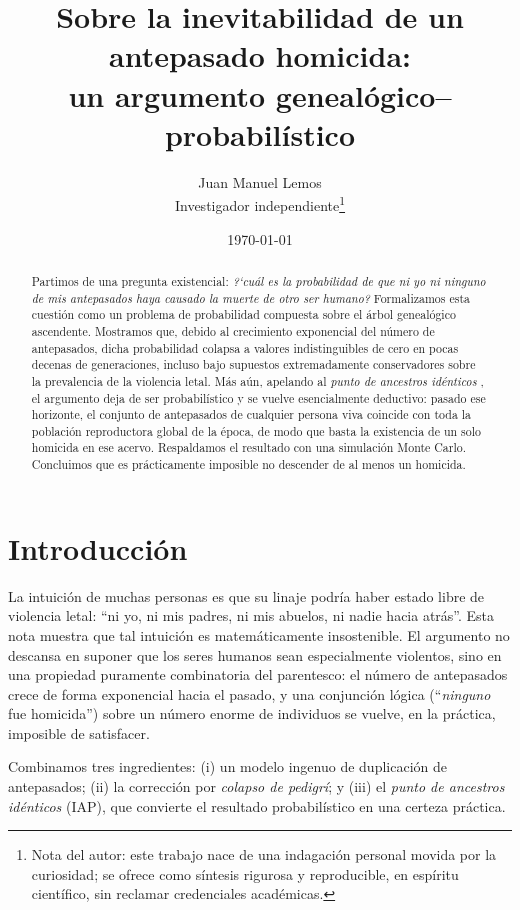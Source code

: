 \documentclass[11pt]{article}
\title{\textbf{Sobre la inevitabilidad de un antepasado homicida:\\
un argumento geneal\'ogico--probabil\'istico}}
\author{Juan Manuel Lemos\\
\normalsize Investigador independiente\thanks{Nota del autor: este trabajo nace
de una indagaci\'on personal movida por la curiosidad; se ofrece como s\'intesis
rigurosa y reproducible, en esp\'iritu cient\'ifico, sin reclamar credenciales
acad\'emicas.}}
\date{\today}
\begin{document}
\maketitle

\begin{abstract}
\noindent Partimos de una pregunta existencial: \emph{?`cu\'al es la
probabilidad de que ni yo ni ninguno de mis antepasados haya causado la muerte
de otro ser humano?} Formalizamos esta cuesti\'on como un problema de
probabilidad compuesta sobre el \'arbol geneal\'ogico ascendente. Mostramos que,
debido al crecimiento exponencial del n\'umero de antepasados, dicha
probabilidad colapsa a valores indistinguibles de cero en pocas decenas de
generaciones, incluso bajo supuestos extremadamente conservadores sobre la
prevalencia de la violencia letal. M\'as a\'un, apelando al \emph{punto de
ancestros id\'enticos} \citep{rohde2004}, el argumento deja de ser
probabil\'istico y se vuelve esencialmente deductivo: pasado ese horizonte, el
conjunto de antepasados de cualquier persona viva coincide con toda la
poblaci\'on reproductora global de la \'epoca, de modo que basta la existencia
de un solo homicida en ese acervo. Respaldamos el resultado con una simulaci\'on
Monte Carlo. Concluimos que es pr\'acticamente imposible no descender de al
menos un homicida.
\end{abstract}

\section{Introducci\'on}

La intuici\'on de muchas personas es que su linaje podr\'ia haber estado libre
de violencia letal: ``ni yo, ni mis padres, ni mis abuelos, ni nadie hacia
atr\'as''. Esta nota muestra que tal intuici\'on es matem\'aticamente
insostenible. El argumento no descansa en suponer que los seres humanos sean
especialmente violentos, sino en una propiedad puramente combinatoria del
parentesco: el n\'umero de antepasados crece de forma exponencial hacia el
pasado, y una conjunci\'on l\'ogica (``\emph{ninguno} fue homicida'') sobre un
n\'umero enorme de individuos se vuelve, en la pr\'actica, imposible de
satisfacer.

Combinamos tres ingredientes: (i) un modelo ingenuo de duplicaci\'on de
antepasados; (ii) la correcci\'on por \emph{colapso de pedigr\'i}; y (iii) el
\emph{punto de ancestros id\'enticos} (IAP), que convierte el resultado
probabil\'istico en una certeza pr\'actica.
\end{document}
